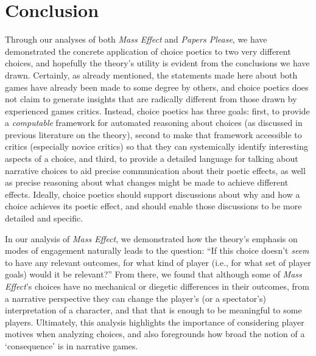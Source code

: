 \documentclass[arts,article,submit,moreauthors,pdftex,10pt,a4paper]{Definitions/mdpi}
\begin{document}
\section{Conclusion}

Through our analyses of both \emph{Mass Effect} and \emph{Papers Please}, we have demonstrated the concrete application of choice poetics to two very different choices, and hopefully the theory's utility is evident from the conclusions we have drawn.
%
Certainly, as already mentioned, the statements made here about both games have already been made to some degree by others, and choice poetics does not claim to generate insights that are radically different from those drawn by experienced games critics.
%
Instead, choice poetics has three goals: first, to provide a \emph{computable} framework for automated reasoning about choices (as discussed in previous literature on the theory), second to make that framework accessible to critics (especially novice critics) so that they can systemically identify interesting aspects of a choice, and third, to provide a detailed language for talking about narrative choices to aid precise communication about their poetic effects, as well as precise reasoning about what changes might be made to achieve different effects.
%
Ideally, choice poetics should support discussions about why and how a choice achieves its poetic effect, and should enable those discussions to be more detailed and specific.


In our analysis of \emph{Mass Effect}, we demonstrated how the theory's emphasis on modes of engagement naturally leads to the question: ``If this choice doesn't \emph{seem} to have any relevant outcomes, for what kind of player (i.e., for what set of player goals) would it be relevant?''
%
From there, we found that although some of \emph{Mass Effect}'s choices have no mechanical or diegetic differences in their outcomes, from a narrative perspective they can change the player's (or a spectator's) interpretation of a character, and that that is enough to be meaningful to some players.
%
Ultimately, this analysis highlights the importance of considering player motives when analyzing choices, and also foregrounds how broad the notion of a `consequence' is in narrative games.
\end{document}
